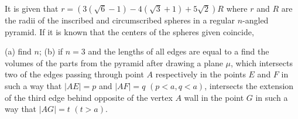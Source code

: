It is given that $r=\left(3\left(\sqrt6-1\right)-4\left(\sqrt3+1\right)+5\sqrt2\right)R$ where $r$ and $R$ are the radii of the inscribed and circumscribed spheres in a regular $n$-angled pyramid. If it is known that the centers of the spheres given coincide,

(a) find $n$;
(b) if $n=3$ and the lengths of all edges are equal to a find the volumes of the parts from the pyramid after drawing a plane $\mu$, which intersects two of the edges passing through point $A$ respectively in the points $E$ and $F$ in such a way that $|AE|=p$ and $|AF|=q$ $(p<a,q<a)$, intersects the extension of the third edge behind opposite of the vertex $A$ wall in the point $G$ in such a way that $|AG|=t$ $(t>a)$.